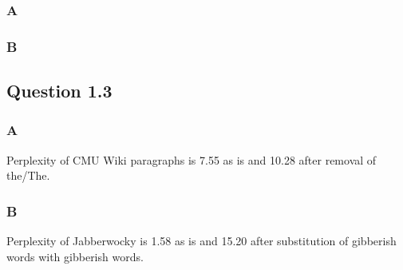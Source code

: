 \documentclass[11pt]{article}
\begin{document}
\subsubsection{A}
\label{sec:org01e0ef8}

\subsubsection{B}
\label{sec:orge858c82}

\subsection{Question 1.3}
\label{sec:orgd47b0c8}
\subsubsection{A}
\label{sec:orgfd82bf4}
Perplexity of CMU Wiki paragraphs is 7.55 as is and 10.28 after removal of the/The.

\subsubsection{B}
\label{sec:orga0e737a}
Perplexity of Jabberwocky is 1.58 as is and 15.20 after substitution of gibberish words with gibberish words.
\end{document}
